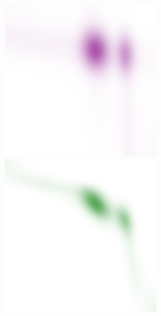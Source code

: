 \documentclass[cn,10pt,math=newtx,citestyle=gb7714-2015,bibstyle=gb7714-2015]{elegantbook}
\begin{document}
\begin{figure}[H]
\begin{minipage}{0.20\linewidth}
\begin{mdframed}
		    \includegraphics[width=\linewidth]{figure/fig4.2/evol-img-17.png}
		\end{mdframed}
	\end{minipage}
	\begin{minipage}{0.20\linewidth}
		\centering
		\begin{mdframed}
		    \includegraphics[width=\linewidth]{figure/fig4.2/evol-img-33.png}

\end{mdframed}
\end{minipage}
\end{figure}
\end{document}

